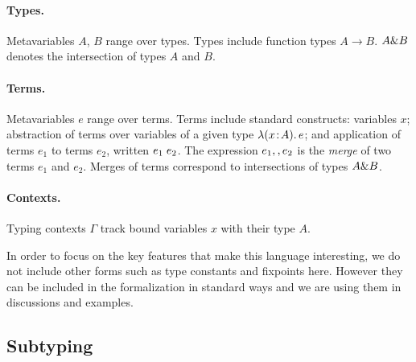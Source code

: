 \paragraph{Types.} Metavariables $A$, $B$ range over types. Types include
function types $A \to B$. $A \& B$ denotes the
intersection of types $A$ and $B$.

\paragraph{Terms.} Metavariables $e$ range over terms.  Terms include standard
constructs: variables $x$; abstraction of terms over variables of
a given type $\lambda (x \!:\! A).\, e$; and application of terms $e_1$ to terms $e_2$, written
$e_1 \; e_2$. The expression $e_1 ,, e_2$ is the
\emph{merge} of two terms $e_1$ and $e_2$.
Merges of terms correspond to intersections of types $A \& B$.

\paragraph{Contexts.} Typing contexts $ \Gamma $ track bound variables $x$ with their type $A$.


In order to focus on the key features that make this language interesting, we do
not include other forms such as type constants
and fixpoints here. However they can be included in the formalization in
standard ways and we are using them in discussions and examples.


\subsection{Subtyping}


